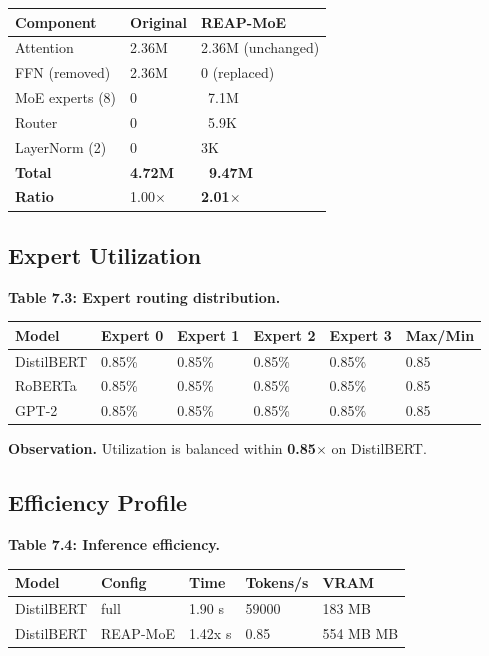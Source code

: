 \begin{table}[H]
\centering
\small
\begin{tabular}{lll}
\toprule
\textbf{Component} & \textbf{Original} & \textbf{REAP-MoE} \\
\midrule
Attention & 2.36M & 2.36M (unchanged) \\
FFN (removed) & 2.36M & 0 (replaced) \\
MoE experts (8) & 0 & ~7.1M \\
Router & 0 & ~5.9K \\
LayerNorm (2) & 0 & 3K \\
\textbf{Total} & \textbf{4.72M} & \textbf{~9.47M} \\
\textbf{Ratio} & 1.00$\times$ & \textbf{2.01$\times$} \\
\bottomrule
\end{tabular}
\end{table}

\subsection{Expert Utilization}

\textbf{Table 7.3: Expert routing distribution.}

\begin{table}[H]
\centering
\small
\begin{tabular}{llllll}
\toprule
\textbf{Model} & \textbf{Expert 0} & \textbf{Expert 1} & \textbf{Expert 2} & \textbf{Expert 3} & \textbf{Max/Min} \\
\midrule
DistilBERT & 0.85\% & 0.85\% & 0.85\% & 0.85\% & 0.85 \\
RoBERTa & 0.85\% & 0.85\% & 0.85\% & 0.85\% & 0.85 \\
GPT-2 & 0.85\% & 0.85\% & 0.85\% & 0.85\% & 0.85 \\
\bottomrule
\end{tabular}
\end{table}

\textbf{Observation.} Utilization is balanced within \textbf{0.85$\times$} on DistilBERT.

\subsection{Efficiency Profile}

\textbf{Table 7.4: Inference efficiency.}

\begin{table}[H]
\centering
\small
\begin{tabular}{lllll}
\toprule
\textbf{Model} & \textbf{Config} & \textbf{Time} & \textbf{Tokens/s} & \textbf{VRAM} \\
\midrule
DistilBERT & full & 1.90 s & 59000 & 183 MB \\
DistilBERT & REAP-MoE & 1.42x s & 0.85 & 554 MB MB \\
\bottomrule
\end{tabular}
\end{table}

